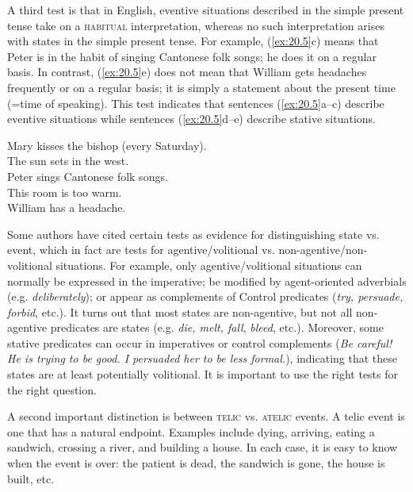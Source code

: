 A third test is that in English, eventive situations described in the simple present tense take on a \textsc{habitual} interpretation, whereas no such interpretation arises with states in the simple present tense. For example, (\ref{ex:20.5}c) means that Peter is in the habit of singing Cantonese folk songs; he does it on a regular basis. In contrast, (\ref{ex:20.5}e) does not mean that William gets headaches frequently or on a regular basis; it is simply a statement about the present time (=time of speaking). This test indicates that sentences (\ref{ex:20.5}a--c) describe eventive situations while sentences (\ref{ex:20.5}d--e) describe stative situations.


\ea \label{ex:20.5}
\ea  Mary kisses the bishop (every Saturday).\\
\ex The sun sets in the west.\\
\ex Peter sings Cantonese folk songs.\\
\ex This room is too warm.\\
\ex William has a headache.
                       \z
\z


Some authors have cited certain tests as evidence for distinguishing state vs. event, which in fact are tests for agentive/volitional vs. non-agentive/non-volitional situations. For example, only agentive/volitional situations can normally be expressed in the imperative; be modified by agent-oriented adverbials (e.g. \textit{deliberately}); or appear as complements of Control predicates (\textit{try, persuade, forbid}, etc.). It turns out that most states are non-agentive, but not all non-agentive predicates are states (e.g. \textit{die, melt, fall}, \textit{bleed}, etc.). Moreover, some stative predicates can occur in imperatives or control complements (\textit{Be careful! He is trying to be good. I persuaded her to be less formal.}), indicating that these states are at least potentially volitional. It is important to use the right tests for the right question.



A second important distinction is between \textsc{telic} vs. \textsc{atelic} events. A telic event is one that has a natural endpoint. Examples include dying, arriving, eating a sandwich, crossing a river, and building a house. In each case, it is easy to know when the event is over: the patient is dead, the sandwich is gone, the house is built, etc.



